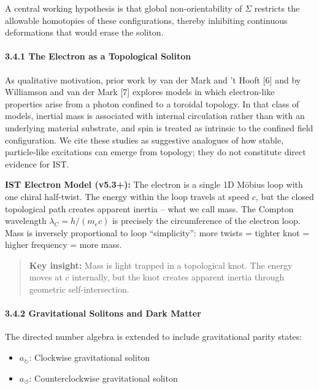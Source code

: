\documentclass[
]{article}
\providecommand{\tightlist}{%
  \setlength{\itemsep}{0pt}\setlength{\parskip}{0pt}}
\begin{document}
A central working hypothesis is that global non-orientability of
\(\Sigma\) restricts the allowable homotopies of these configurations,
thereby inhibiting continuous deformations that would erase the soliton.

\paragraph{3.4.1 The Electron as a Topological
Soliton}\label{the-electron-as-a-topological-soliton}

As qualitative motivation, prior work by van der Mark and 't Hooft
{[}6{]} and by Williamson and van der Mark {[}7{]} explores models in
which electron-like properties arise from a photon confined to a
toroidal topology. In that class of models, inertial mass is associated
with internal circulation rather than with an underlying material
substrate, and spin is treated as intrinsic to the confined field
configuration. We cite these studies as suggestive analogues of how
stable, particle-like excitations can emerge from topology; they do not
constitute direct evidence for IST.

\textbf{IST Electron Model (v5.3+):} The electron is a single 1D Möbius
loop with one chiral half-twist. The energy within the loop travels at
speed \(c\), but the closed topological path creates apparent inertia --
what we call mass. The Compton wavelength \(\lambda_C = h/(m_e c)\) is
precisely the circumference of the electron loop. Mass is inversely
proportional to loop ``simplicity'': more twists = tighter knot = higher
frequency = more mass.

\begin{quote}
\textbf{Key insight:} Mass is light trapped in a topological knot. The
energy moves at \(c\) internally, but the knot creates apparent inertia
through geometric self-intersection.
\end{quote}

\paragraph{3.4.2 Gravitational Solitons and Dark
Matter}\label{gravitational-solitons-and-dark-matter}

The directed number algebra is extended to include gravitational parity
states:

\begin{itemize}
\tightlist
\item
  \textbf{\(a_{\circlearrowright}\)}: Clockwise gravitational soliton
\item
  \textbf{\(a_{\circlearrowleft}\)}: Counterclockwise gravitational
  soliton
\end{itemize}
\end{document}
